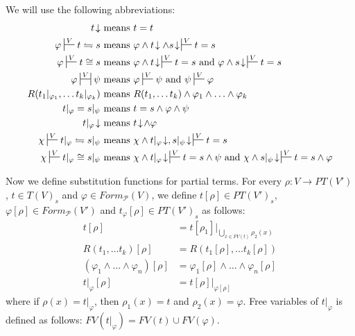 \documentclass[reqno]{amsart}
\theoremstyle{definition}
\theoremstyle{remark}
\numberwithin{figure}{section}
\begin{document}
We will use the following abbreviations:
\begin{align*}
t\!\downarrow & \text{ means } t = t \\
\varphi \sststile{}{V} t \leftrightharpoons s & \text{ means } \varphi \land t\!\downarrow \land s\!\downarrow\,\sststile{}{V} t = s \\
\varphi \sststile{}{V} t \cong s & \text{ means } \varphi \land t\!\downarrow\,\sststile{}{V} t = s \text{ and } \varphi \land s\!\downarrow\,\sststile{}{V} t = s \\
\varphi \ssststile{}{V} \psi & \text{ means } \varphi \sststile{}{V} \psi \text{ and } \psi \sststile{}{V} \varphi \\
R(t_1|_{\varphi_1}, \ldots t_k|_{\varphi_k}) & \text{ means } R(t_1, \ldots t_k) \land \varphi_1 \land \ldots \land \varphi_k \\
t|_\varphi = s|_\psi & \text{ means } t = s \land \varphi \land \psi \\
t|_\varphi\!\downarrow & \text{ means } t\!\downarrow\!\land \varphi \\
\chi \sststile{}{V} t|_\varphi \leftrightharpoons s|_\psi & \text{ means } \chi \land t|_\varphi\!\downarrow, s|_\psi\!\downarrow\,\sststile{}{V} t = s \\
\chi \sststile{}{V} t|_\varphi \cong s|_\psi & \text{ means } \chi \land t|_\varphi\!\downarrow\,\sststile{}{V} t = s \land \psi \text{ and } \chi \land s|_\psi\!\downarrow\,\sststile{}{V} t = s \land \varphi
\end{align*}

Now we define substitution functions for partial terms.
For every $\rho : V \to PT(V')$, $t \in T(V)_s$ and $\varphi \in Form_\mathcal{P}(V)$,
we define $t[\rho] \in PT(V')_s$, $\varphi[\rho] \in Form_\mathcal{P}(V')$ and $t_\varphi[\rho] \in PT(V')_s$ as follows:
\begin{align*}
t[\rho] & = t[\rho_1]|_{\bigcup_{x \in FV(t)} \rho_2(x)} \\
R(t_1, \ldots t_k)[\rho] & = R(t_1[\rho], \ldots t_k[\rho]) \\
(\varphi_1 \land \ldots \land \varphi_n)[\rho] & = \varphi_1[\rho] \land \ldots \land \varphi_n[\rho] \\
t|_\varphi[\rho] & = t[\rho]|_{\varphi[\rho]}
\end{align*}
where if $\rho(x) = t|_\varphi$, then $\rho_1(x) = t$ and $\rho_2(x) = \varphi$.
Free variables of $t|_\varphi$ is defined as follows: $FV(t|_\varphi) = FV(t) \cup FV(\varphi)$.
\end{document}
